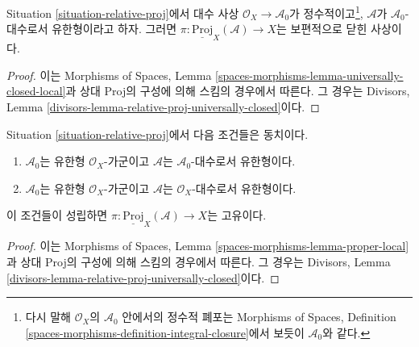 \begin{lemma}
\label{lemma-relative-proj-universally-closed}
Situation \ref{situation-relative-proj}에서 대수 사상
$\mathcal{O}_X \to \mathcal{A}_0$가 정수적이고\footnote{다시 말해
$\mathcal{O}_X$의 $\mathcal{A}_0$ 안에서의 정수적 폐포는 Morphisms of
Spaces, Definition \ref{spaces-morphisms-definition-integral-closure}에서
보듯이 $\mathcal{A}_0$와 같다.}, $\mathcal{A}$가
$\mathcal{A}_0$-대수로서 유한형이라고 하자. 그러면
$\pi : \underline{\text{Proj}}_X(\mathcal{A}) \to X$는 보편적으로
닫힌 사상이다.
\end{lemma}

\begin{proof}
이는 Morphisms of Spaces, Lemma
\ref{spaces-morphisms-lemma-universally-closed-local}과 상대 Proj의
구성에 의해 스킴의 경우에서 따른다. 그 경우는 Divisors, Lemma
\ref{divisors-lemma-relative-proj-universally-closed}이다.
\end{proof}

\begin{lemma}
\label{lemma-relative-proj-proper}
Situation \ref{situation-relative-proj}에서 다음 조건들은 동치이다.
\begin{enumerate}
\item $\mathcal{A}_0$는 유한형 $\mathcal{O}_X$-가군이고
$\mathcal{A}$는 $\mathcal{A}_0$-대수로서 유한형이다.
\item $\mathcal{A}_0$는 유한형 $\mathcal{O}_X$-가군이고
$\mathcal{A}$는 $\mathcal{O}_X$-대수로서 유한형이다.
\end{enumerate}
이 조건들이 성립하면
$\pi : \underline{\text{Proj}}_X(\mathcal{A}) \to X$는 고유이다.
\end{lemma}

\begin{proof}
이는 Morphisms of Spaces, Lemma
\ref{spaces-morphisms-lemma-proper-local}과 상대 Proj의 구성에 의해
스킴의 경우에서 따른다. 그 경우는
Divisors, Lemma \ref{divisors-lemma-relative-proj-universally-closed}이다.
\end{proof}


